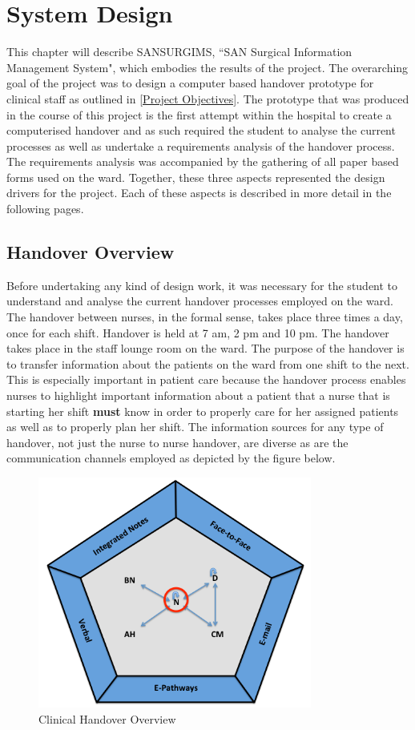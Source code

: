 \section{System Design}
This chapter will describe SANSURGIMS, ``SAN Surgical Information Management System", which embodies the results of the project. The overarching goal of the project was to design a computer based handover prototype for clinical staff as outlined in \ref{Project Objectives}. The prototype that was produced in the course of this project is the first attempt within the hospital to create a computerised handover and as such required the student to analyse the current processes as well as undertake a requirements analysis of the handover process. The requirements analysis was accompanied by the gathering of all paper based forms used on the ward. Together, these three aspects represented the design drivers for the project. Each of these aspects is described in more detail in the following pages.   

\subsection{Handover Overview}
Before undertaking any kind of design work, it was necessary for the student to understand and analyse the current handover processes employed on the ward.   The handover between nurses, in the formal sense, takes place three times a day, once for each shift. Handover is held at 7 am, 2 pm and 10 pm. The handover takes place in the staff lounge room on the ward. The purpose of the handover is to transfer information about the patients on the ward from one shift to the next. This is especially important in patient care because the handover process enables nurses to highlight important information about a patient that a nurse that is starting her shift \textbf{must} know in order to properly care for her assigned patients as well as to properly plan her shift. The information sources for any type of handover, not just the nurse to nurse handover, are diverse as are the communication channels employed as depicted by the figure below.
\newpage
\begin{figure}[hp]
				\centering
				\includegraphics[scale=1.0, width=90mm]{Images/Clinical_Handover_Overview}
				\caption{Clinical Handover Overview}
\end{figure} 

